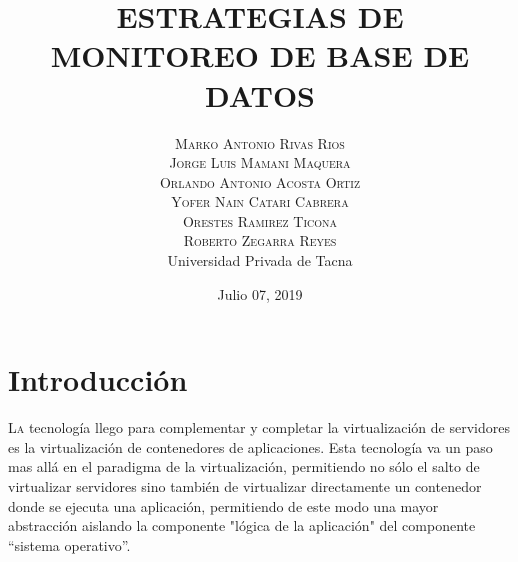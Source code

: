 \documentclass[twoside,twocolumn]{article}
\title{ESTRATEGIAS DE MONITOREO DE BASE DE DATOS} %
\author{%
\textsc{Marko Antonio Rivas Rios} \\[1ex] %
\textsc{Jorge Luis Mamani Maquera} \\[1.01ex] %
\textsc{Orlando Antonio Acosta Ortiz} \\[1.02ex] %
\textsc{Yofer Nain Catari Cabrera} \\[1.03ex] %
\textsc{Orestes Ramirez Ticona} \\[1.04ex] %
\textsc{Roberto Zegarra Reyes} \\[1.05ex] %
\normalsize Universidad Privada de Tacna \\  %
\normalsize {} %
}
\date{Julio 07, 2019} %
\begin{document}
\maketitle


\section{Introducción}

\lettrine[nindent=0em,lines=2]{L}a tecnología llego para complementar y completar la virtualización de servidores es la
virtualización de contenedores de aplicaciones. Esta tecnología va un paso mas allá en el
paradigma de la virtualización, permitiendo no sólo el salto de virtualizar servidores sino también
de virtualizar directamente un contenedor donde se ejecuta una aplicación, permitiendo de este
modo una mayor abstracción aislando la componente "lógica de la aplicación" del componente
“sistema operativo”.
\end{document}
